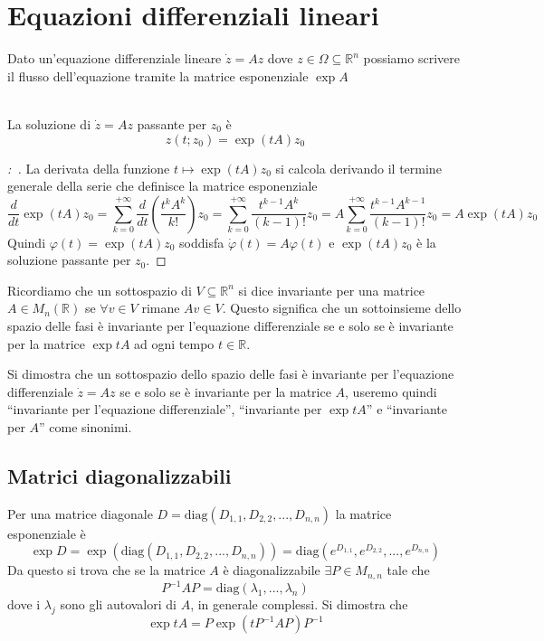 \documentclass[11pt,a4paper,twoside]{book}
\newenvironment{proposizione}[1][\empty]{\begin{Proposizione}{
\ifx\empty#1\relax\else\mdseries\itshape#1\\\fi
}{}}{\end{Proposizione}}
\newenvironment{dimo}[1][\proofname]{
	\begin{tcolorbox}[
	breakable, 
	enhanced, 
	interior hidden, 
	frame hidden, 
	borderline west = {1pt}{0pt}{gray}, 
	top=0pt, bottom=0pt, left=0pt]
\begin{proof}[#1:~]
}
{
\end{proof}
\end{tcolorbox}
}
\theoremstyle{esss}
\theoremstyle{dotless}
\numberwithin{equation}{section} %
\begin{document}
\section{Equazioni differenziali lineari}
Dato un'equazione differenziale lineare $\dot{z}=Az$ dove $z\in\Omega\subseteq\mathbb{R}^n$ possiamo scrivere il flusso dell'equazione tramite la matrice esponenziale $\exp{A}$

\begin{proposizione}
La soluzione di $\dot{z}=Az$ passante per $z_0$ è
\[
z(t;z_0)=\exp{(tA)}z_0
\]
\end{proposizione}
\begin{dimo}
La derivata della funzione $t\mapsto\exp{(tA)}z_0$ si calcola derivando il termine generale della serie che definisce la matrice esponenziale
\[
\dfrac{d}{dt}\exp{(tA)}z_0=\sum_{k=0}^{+\infty}\dfrac{d}{dt}\left(\dfrac{t^k A^k}{k!}\right)z_0=\sum_{k=0}^{+\infty}\dfrac{t^{k-1}A^k}{(k-1)!}z_0=A\sum_{k=0}^{+\infty}\dfrac{t^{k-1}A^{k-1}}{(k-1)!}z_0=A\exp{(tA)}z_0
\]
Quindi $\varphi(t)=\exp{(tA)}z_0$ soddisfa $\dot{\varphi}(t)=A\varphi(t)$ e $ \exp{(tA)}z_0$ è la soluzione passante per $z_0$.\footnotemark{}  \qedhere
\end{dimo}


Ricordiamo che un sottospazio di $V\subseteq\mathbb{R}^n$ si dice invariante per una matrice $A\in M_n(\mathbb{R})$ se $\forall v\in V$ rimane $Av\in V$. Questo significa che un sottoinsieme dello spazio delle fasi è invariante per l'equazione differenziale se e solo se è invariante per la matrice $\exp{tA}$ ad ogni tempo $t\in \mathbb{R}$.

Si dimostra che un sottospazio dello spazio delle fasi è invariante per l'equazione differenziale $\dot{z}=Az$ se e solo se è invariante per la matrice $A$, useremo quindi ``invariante per l'equazione differenziale'', ``invariante per $\exp{tA}$'' e ``invariante per $A$'' come sinonimi.

\subsection{Matrici diagonalizzabili}\label{sezMatriciDiagonalizzabili}

Per una matrice diagonale $D=\text{diag}(D_{1,1},D_{2,2},...,D_{n,n})$ la matrice esponenziale è 
\[\exp{D}=\exp{\left(\text{diag}(D_{1,1},D_{2,2},...,D_{n,n})\right)}=\text{diag}(e^{D_{1,1}},e^{D_{2,2}},...,e^{D_{n,n}})\]
Da questo si trova che se la matrice $A$ è diagonalizzabile
$\exists P\in M_{n,n}$ tale che 
\[P^{-1}AP=\text{diag}\left( \lambda_1,...,\lambda_n \right)\] 
dove i $\lambda_j$ sono gli autovalori di $A$, in generale complessi.
Si dimostra che
\[
\exp{tA}=P \exp{\left( tP^{-1}AP \right)} P^{-1}
\]
\end{document}
